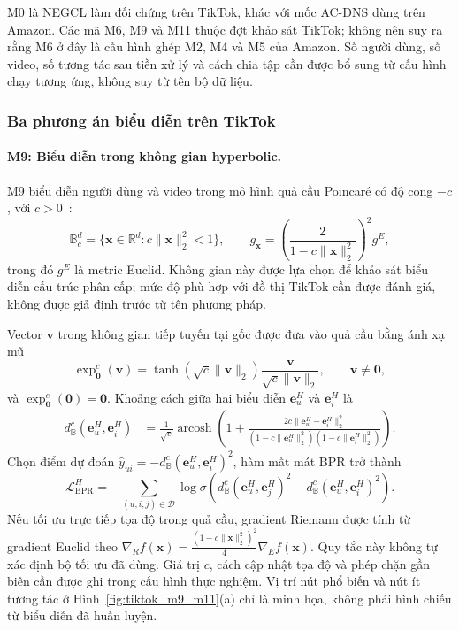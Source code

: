 M0 là NEGCL làm đối chứng trên TikTok, khác với mốc AC-DNS dùng trên Amazon. Các mã M6, M9 và M11 thuộc đợt khảo sát TikTok; không nên suy ra rằng M6 ở đây là cấu hình ghép M2, M4 và M5 của Amazon. Số người dùng, số video, số tương tác sau tiền xử lý và cách chia tập cần được bổ sung từ cấu hình chạy tương ứng, không suy từ tên bộ dữ liệu.

\subsubsection{Ba phương án biểu diễn trên TikTok}


\paragraph{M9: Biểu diễn trong không gian hyperbolic.}
M9 biểu diễn người dùng và video trong mô hình quả cầu Poincaré có độ cong $-c$, với $c>0$~\cite{ganea2018hyperbolic}:
\begin{equation}
\mathbb B_c^d=\{\mathbf x\in\mathbb R^d:c\|\mathbf x\|_2^2<1\},
\qquad g_{\mathbf x}=\left(\frac{2}{1-c\|\mathbf x\|_2^2}\right)^2g^E,
\end{equation}
trong đó $g^E$ là metric Euclid. Không gian này được lựa chọn để khảo sát biểu diễn cấu trúc phân cấp; mức độ phù hợp với đồ thị TikTok cần được đánh giá, không được giả định trước từ tên phương pháp.

Vector $\mathbf v$ trong không gian tiếp tuyến tại gốc được đưa vào quả cầu bằng ánh xạ mũ
\begin{equation}
\exp_{\mathbf0}^c(\mathbf v)=\tanh(\sqrt c\|\mathbf v\|_2)
\frac{\mathbf v}{\sqrt c\|\mathbf v\|_2},\qquad \mathbf v\ne\mathbf0,
\end{equation}
và $\exp_{\mathbf0}^c(\mathbf0)=\mathbf0$. Khoảng cách giữa hai biểu diễn $\mathbf e_u^H$ và $\mathbf e_i^H$ là
\begin{equation}
\begin{aligned}
d_{\mathbb B}^c(\mathbf e_u^H,\mathbf e_i^H)
&=\frac{1}{\sqrt c}\operatorname{arcosh}\left(1+
\frac{2c\|\mathbf e_u^H-\mathbf e_i^H\|_2^2}
{(1-c\|\mathbf e_u^H\|_2^2)(1-c\|\mathbf e_i^H\|_2^2)}\right).
\end{aligned}
\label{eq:poincare_dist}
\end{equation}
Chọn điểm dự đoán $\hat y_{ui}=-d_{\mathbb B}^c(\mathbf e_u^H,\mathbf e_i^H)^2$, hàm mất mát BPR trở thành
\begin{equation}
\mathcal L_{\text{BPR}}^H=-\sum_{(u,i,j)\in\mathcal D}\log\sigma\left(
 d_{\mathbb B}^c(\mathbf e_u^H,\mathbf e_j^H)^2-
 d_{\mathbb B}^c(\mathbf e_u^H,\mathbf e_i^H)^2\right).
\end{equation}
Nếu tối ưu trực tiếp tọa độ trong quả cầu, gradient Riemann được tính từ gradient Euclid theo
$\nabla_R f(\mathbf x)=\frac{(1-c\|\mathbf x\|_2^2)^2}{4}\nabla_E f(\mathbf x)$.
Quy tắc này không tự xác định bộ tối ưu đã dùng. Giá trị $c$, cách cập nhật tọa độ và phép chặn gần biên cần được ghi trong cấu hình thực nghiệm. Vị trí nút phổ biến và nút ít tương tác ở Hình~\ref{fig:tiktok_m9_m11}(a) chỉ là minh họa, không phải hình chiếu từ biểu diễn đã huấn luyện.

